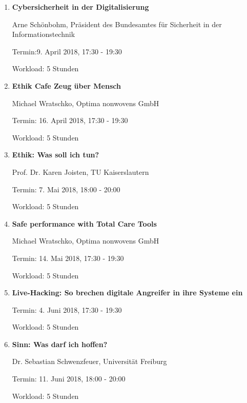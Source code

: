 \documentclass[a4paper, 12pt]{scrartcl} %
\begin{document}
\begin{enumerate}
\item\textbf{Cybersicherheit in der Digitalisierung} \par
Arne Schönbohm, Präsident des Bundesamtes für Sicherheit in der Informationstechnik\par
Termin:9. April 2018, 17:30 - 19:30 \par
Workload: 5 Stunden
\item\textbf{Ethik Cafe Zeug über Mensch} \par
Michael Wratschko, Optima nonwovens GmbH\par
Termin: 16. April 2018, 17:30 - 19:30  \par
Workload: 5 Stunden
\item\textbf{Ethik: Was soll ich tun?} \par
Prof. Dr. Karen Joisten, TU Kaiserslautern\par
Termin: 7. Mai 2018, 18:00 - 20:00  \par
Workload: 5 Stunden
\item\textbf{Safe performance with Total Care Tools} \par
Michael Wratschko, Optima nonwovens GmbH\par
Termin: 14. Mai 2018, 17:30 - 19:30  \par
Workload: 5 Stunden
\item\textbf{Live-Hacking: So brechen digitale Angreifer in ihre Systeme ein} \par \par
Termin: 4. Juni 2018, 17:30 - 19:30  \par
Workload: 5 Stunden
\item\textbf{Sinn: Was darf ich hoffen?} \par
Dr. Sebastian Schwenzfeuer, Universität Freiburg\par
Termin: 11. Juni 2018, 18:00 - 20:00  \par
Workload: 5 Stunden
\end{enumerate}
\clearpage
\end{document}
